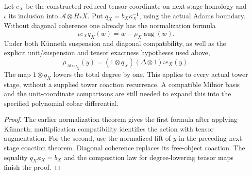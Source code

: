 \begin{proposition}
  \label{prop:h6-next-stage-coproduct}
  \leanok
  Let $e_X$ be the constructed reduced-tensor coordinate on next-stage
  homology and $\iota$ its inclusion into $\mathcal A\otimes H_*X$.
  Put $q_X=b_X\kappa_X^{-1}$, using the actual Adams boundary.
  Without diagonal coherence one already has the normalization formula
  \[
    \iota e_Xq_X(w)=w-\rho_X\operatorname{aug}(w).
  \]
  Under both K\"unneth suspension and diagonal compatibility, as well as
  the explicit unit/suspension and tensor exactness hypotheses used above,
  \[
    \rho_{\operatorname{fib}\eta_X}(y)
       =(1\otimes q_X)(\Delta\otimes1)\iota e_X(y).
  \]
  The map $1\otimes q_X$ lowers the total degree by one. This applies to
  every actual tower stage, without a supplied tower coaction recurrence.
  A compatible Milnor basis and the unit-coordinate comparisons are still
  needed to expand this into the specified polynomial cobar differential.
\end{proposition}
\begin{proof}
  The earlier normalization theorem gives the first formula after
  applying K\"unneth; multiplication compatibility identifies the action
  with tensor augmentation. For the second, use the normalized lift of
  $y$ in the preceding next-stage coaction theorem. Diagonal coherence
  replaces its free-object coaction. The equality $q_X\kappa_X=b_X$
  and the composition law for degree-lowering tensor maps finish the proof.
  \leanok
\end{proof}

